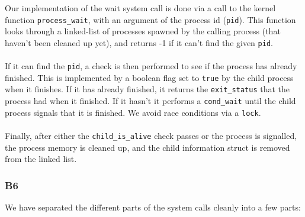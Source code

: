 \documentclass[a4wide, 11pt]{article}
\begin{document}
Our implementation of the wait system call is done via a call to the kernel function \texttt{process\_wait}, with an argument of the process id (\texttt{pid}). This function looks through a linked-list of processes spawned by the calling process (that haven't been cleaned up yet), and returns -1 if it can't find the given \texttt{pid}.
\\\\
If it can find the \texttt{pid}, a check is then performed to see if the process has already finished. This is implemented by a boolean flag set to \texttt{true} by the child process when it finishes. If it has already finished, it returns the \texttt{exit\_status} that the process had when it finished. If it hasn't it performs a \texttt{cond\_wait} until the child process signals that it is finished. We avoid race conditions via a \texttt{lock}.
\\\\
Finally, after either the \texttt{child\_is\_alive} check passes or the process is signalled, the process memory is cleaned up, and the child information struct is removed from the linked list.

\subsubsection{B6}

We have separated the different parts of the system calls cleanly into a few parts:
\end{document}
